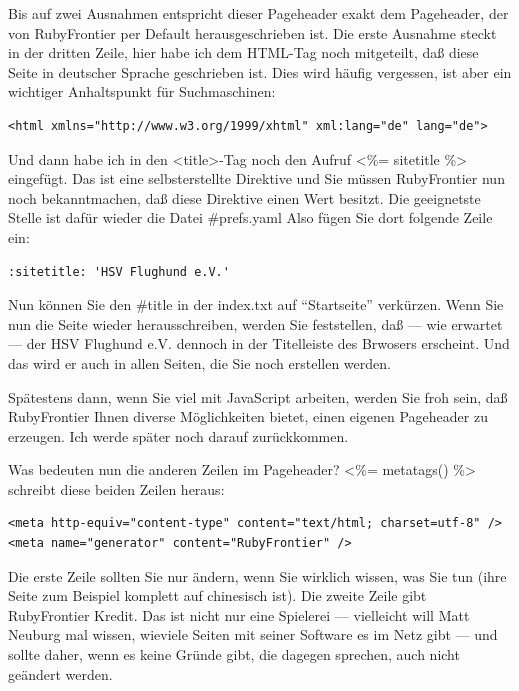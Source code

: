 \documentclass[11pt]{report}
\begin{document}
Bis auf zwei Ausnahmen entspricht dieser Pageheader exakt dem
Pageheader, der von RubyFrontier per Default herausgeschrieben
ist. Die erste Ausnahme steckt in der dritten Zeile, hier habe ich dem
HTML-Tag noch mitgeteilt, daß diese Seite in deutscher Sprache
geschrieben ist. Dies wird häufig vergessen, ist aber ein wichtiger
Anhaltspunkt für Suchmaschinen:


\begin{verbatim}
<html xmlns="http://www.w3.org/1999/xhtml" xml:lang="de" lang="de">
\end{verbatim}

Und dann habe ich in den <title>-Tag noch den Aufruf <\%= sitetitle \%>
eingefügt. Das ist eine selbsterstellte Direktive und Sie müssen
RubyFrontier nun noch bekanntmachen, daß diese Direktive einen Wert
besitzt. Die geeignetste Stelle ist dafür wieder die Datei \#prefs.yaml
Also fügen Sie dort folgende Zeile ein:


\begin{verbatim}
:sitetitle: 'HSV Flughund e.V.'
\end{verbatim}

Nun können Sie den \#title in der index.txt auf “Startseite”
verkürzen. Wenn Sie nun die Seite wieder herausschreiben, werden Sie
feststellen, daß — wie erwartet — der HSV Flughund e.V. dennoch in der
Titelleiste des Brwosers erscheint. Und das wird er auch in allen
Seiten, die Sie noch erstellen werden.

Spätestens dann, wenn Sie viel mit JavaScript arbeiten, werden Sie
froh sein, daß RubyFrontier Ihnen diverse Möglichkeiten bietet, einen
eigenen Pageheader zu erzeugen. Ich werde später noch darauf
zurückkommen.

Was bedeuten nun die anderen Zeilen im Pageheader? <\%= metatags() \%>
schreibt diese beiden Zeilen heraus:


\begin{verbatim}
<meta http-equiv="content-type" content="text/html; charset=utf-8" />
<meta name="generator" content="RubyFrontier" />
\end{verbatim}

Die erste Zeile sollten Sie nur ändern, wenn Sie wirklich wissen, was
Sie tun (ihre Seite zum Beispiel komplett auf chinesisch ist). Die
zweite Zeile gibt RubyFrontier Kredit. Das ist nicht nur eine
Spielerei — vielleicht will Matt Neuburg mal wissen, wieviele Seiten
mit seiner Software es im Netz gibt — und sollte daher, wenn es keine
Gründe gibt, die dagegen sprechen, auch nicht geändert werden.
\end{document}
